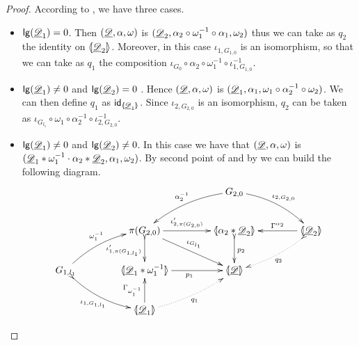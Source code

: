 \begin{proof}According to , we have three cases.
	\begin{itemize}
		\item $\mathsf{lg}(\underline{\mathscr{D}}_1)=0$. Then  $(\underline{\mathscr{D}}, \alpha, \omega)$ is $(\underline{\mathscr{D}}_2, \alpha_2\circ \omega_1^{-1}\circ \alpha_1, \omega_2)$ thus we can take as $q_2$ the identity on $\langle \hspace{-1.85pt}[ \underline{\mathscr{D}}_2]\hspace{-1.85pt}\rangle$. Moreover, in this case $\iota_{1,G_{1,0}}$ is an isomorphism, so that we can take as $q_1$ the composition $\iota_{G_0}\circ \alpha_2\circ \omega^{-1}_1 \circ \iota^{-1}_{1,G_{1,0}}$.
		\item $\mathsf{lg}(\underline{\mathscr{D}}_1)\neq 0$ and $\mathsf{lg}(\underline{\mathscr{D}}_2)=0$ . Hence  $(\underline{\mathscr{D}}, \alpha, \omega)$ is $(\underline{\mathscr{D}}_1, \alpha_1, \omega_1 \circ \alpha^{-1}_2\circ \omega_2)$. We can then define $q_1$ as $\mathsf{id}_{\langle \hspace{-1.85pt}[ \underline{\mathscr{D}}_1]\hspace{-1.85pt}\rangle}$.  Since $\iota_{2,G_{2,0}}$ is an isomorphism, $q_2$ can be taken as  $\iota_{G_{l_1}}\circ  \omega_1  \circ \alpha^{-1}_2 \circ \iota^{-1}_{2,G_{2,0}}$.
		\item  $\mathsf{lg}(\underline{\mathscr{D}}_1)\neq 0$ and $\mathsf{lg}(\underline{\mathscr{D}}_2)\neq 0$. In this case we have that $(\underline{\mathscr{D}}, \alpha, \omega)$  is $(\underline{\mathscr{D}}_1*\omega_1^{-1}\cdot \alpha_2*\underline{\mathscr{D}}_2, \alpha_1, \omega_2)$. By second point of  and by  we can build the following diagram.
		\[\xymatrix@C=40pt{&&G_{2,0}  \ar@/_.3cm/[dl]_{\alpha^{-1}_2} \ar@/^.3cm/[dr]^{\iota_{2, G_{2,0}}}\\&\pi(G_{2,0}) \ar[dr]^{\iota_{G_{l_1}}}\ar[r]^-{\iota'_{2, \pi(G_{2,0})}} \ar@{>->}[d]_-{\iota'_{1, \pi(G_{1,l_1})}} & \lpro \alpha_2*\der{D}_2 \rpro \ar@{>->}[d]^{p_2} &\tproi{D}{2} \ar[l]_-{\Gamma^{\alpha_2}} \ar@{>.>}@/^.2cm/[dl]^{q_2}\\ G_{1,l_1}  \ar@/^.3cm/[ur]^{\omega^{-1}_1}  \ar@{>->}@/_.3cm/[dr]_{\iota_{1, G_{1, l_1}}}& \lpro \der{D}_1*\omega_1^{-1} \rpro  \ar[r]_{p_1}& \tpro{D} \\ &\tproi{D}{1} \ar[u]^{\Gamma_{\omega^{-1}_1}}  \ar@{.>}@/_.2cm/[ur]_{q_1}}\]
		

\end{itemize}
\end{proof}
